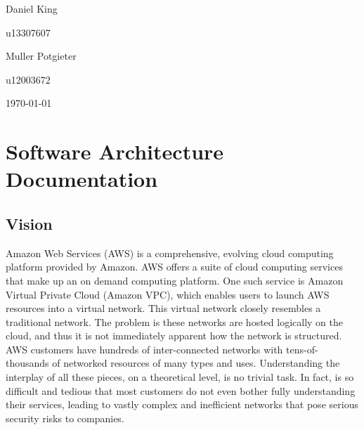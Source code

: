 \documentclass[hidelinks,a4paper,12pt]{article}
\begin{document}
\begin{titlepage}
\begin{center}
\begin{minipage}{0.4\textwidth}
\begin{flushleft} \large
Daniel {King}
\end{flushleft}
\end{minipage}
\begin{minipage}{0.4\textwidth}
\begin{flushright} \large
\emph{}
u13307607
\end{flushright}
\end{minipage}

\begin{minipage}{0.4\textwidth}
\begin{flushleft} \large
Muller {Potgieter}
\end{flushleft}
\end{minipage}
\begin{minipage}{0.4\textwidth}
\begin{flushright} \large
\emph{}
u12003672
\end{flushright}
\end{minipage}

\vfill
{\large \today}
\end{center}
\end{titlepage}
\footnotesize
%
\normalsize


\tableofcontents
\newpage
{}


\section{Software Architecture Documentation}
\subsection{Vision} 
Amazon Web Services (AWS) is a comprehensive, evolving cloud computing platform provided by Amazon. 
AWS offers a suite of cloud computing services that make up an on demand computing platform. One such service is Amazon Virtual Private Cloud (Amazon VPC), which enables users to launch AWS resources into a virtual network. This virtual network closely resembles a traditional network. The problem is these networks are hosted logically on the cloud, and thus it is not immediately apparent how the network is structured. AWS customers have hundreds of inter-connected networks with tens-of- thousands of networked resources of many types and uses. Understanding the interplay of all these pieces, on a theoretical level, is no trivial task. In fact, is so difficult and tedious that most customers do not even bother fully understanding their services, leading to vastly complex and inefficient networks that pose serious security risks to companies.
\end{document}

